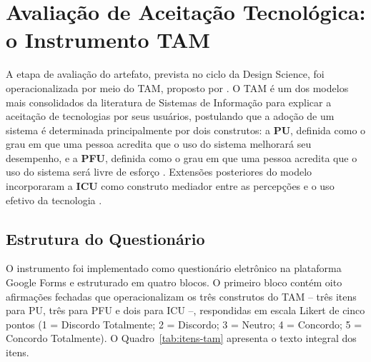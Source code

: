 \section{Avaliação de Aceitação Tecnológica: o Instrumento TAM}
\label{sec:instrumento-tam}

A etapa de avaliação do artefato, prevista no ciclo da Design Science, foi operacionalizada por meio do \gls{TAM}, proposto por . O \gls{TAM} é um dos modelos mais consolidados da literatura de Sistemas de Informação para explicar a aceitação de tecnologias por seus usuários, postulando que a adoção de um sistema é determinada principalmente por dois construtos: a \textbf{\gls{PU}}, definida como o grau em que uma pessoa acredita que o uso do sistema melhorará seu desempenho, e a \textbf{\gls{PFU}}, definida como o grau em que uma pessoa acredita que o uso do sistema será livre de esforço \cite{davis1989}. Extensões posteriores do modelo incorporaram a \textbf{\gls{ICU}} como construto mediador entre as percepções e o uso efetivo da tecnologia \cite{venkatesh2000}.

\subsection{Estrutura do Questionário}
\label{subsec:estrutura-questionario}

O instrumento foi implementado como questionário eletrônico na plataforma Google Forms e estruturado em quatro blocos. O primeiro bloco contém oito afirmações fechadas que operacionalizam os três construtos do TAM -- três itens para PU, três para PFU e dois para ICU --, respondidas em escala Likert de cinco pontos (1 = Discordo Totalmente; 2 = Discordo; 3 = Neutro; 4 = Concordo; 5 = Concordo Totalmente). O Quadro~\ref{tab:itens-tam} apresenta o texto integral dos itens.

